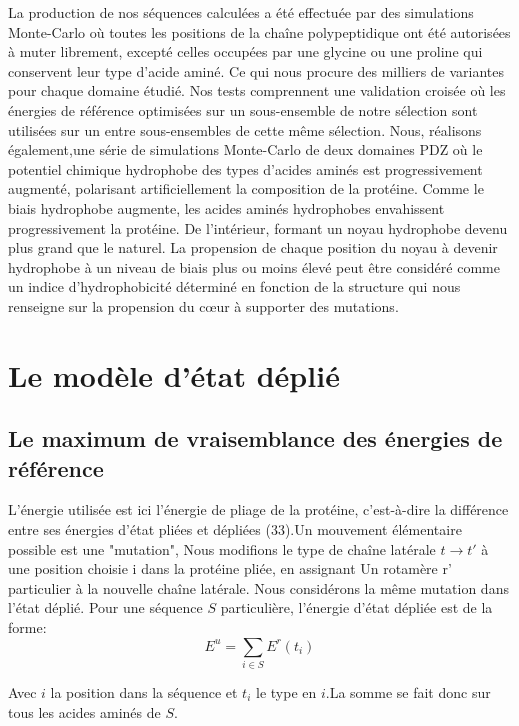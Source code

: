 La production de nos séquences calculées a été effectuée par des simulations Monte-Carlo où toutes les positions de la chaîne polypeptidique ont été autorisées à muter librement, excepté celles occupées par une glycine ou une proline qui conservent leur type d'acide aminé. Ce qui nous procure des milliers de variantes pour chaque domaine étudié. Nos tests comprennent une validation croisée où les énergies de référence optimisées sur un sous-ensemble de notre sélection sont utilisées sur un entre sous-ensembles de cette même sélection. Nous, réalisons également,une série de simulations Monte-Carlo de deux domaines PDZ où le potentiel chimique hydrophobe des types d'acides aminés est progressivement augmenté, polarisant artificiellement la composition de la protéine. Comme le biais hydrophobe augmente, les acides aminés hydrophobes envahissent progressivement  la protéine.
De l'intérieur, formant un noyau hydrophobe devenu plus grand que le naturel.
La propension de chaque position du noyau à devenir hydrophobe à un niveau de biais plus ou moins élevé peut être considéré comme un indice d'hydrophobicité déterminé en fonction de la structure qui nous renseigne sur la propension du cœur à supporter des mutations.

\section{Le modèle d'état déplié}
\subsection{Le maximum de vraisemblance des énergies de référence}

L'énergie utilisée est ici l'énergie de pliage de la protéine, c'est-à-dire la différence entre
ses énergies d'état pliées et dépliées (33).Un mouvement élémentaire possible est une "mutation",
Nous modifions le type de chaîne latérale $t \rightarrow t'$ à une position choisie i dans la protéine pliée, en assignant
Un rotamère r' particulier à la nouvelle chaîne latérale. Nous considérons la même mutation dans
l'état déplié. Pour une séquence $S$ particulière, l'énergie d'état dépliée est de la forme:
\begin{equation}
  E^u=\sum_{i\in S}E^r(t_i)
  \label{eq:unfolded}
\end{equation} 

Avec $i$ la position dans la séquence et $t_i$ le type en $i$.La somme se fait donc sur tous les acides aminés de $S$.

